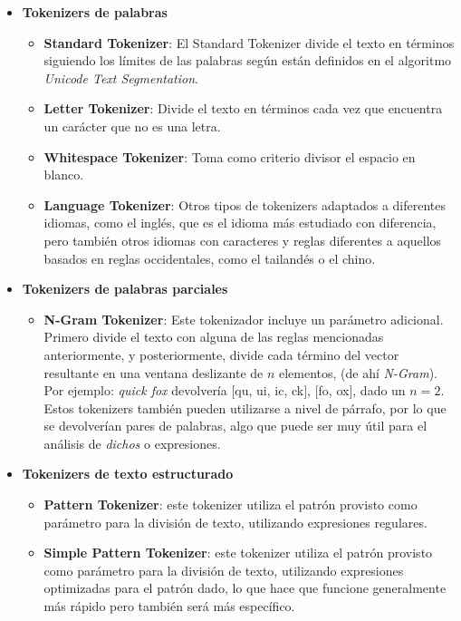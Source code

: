 \begin{itemize}
    
    \item \textbf{Tokenizers de palabras}
    \begin{itemize}
        \item \textbf{Standard Tokenizer}: El Standard Tokenizer divide el texto en términos siguiendo los límites de las palabras según están definidos en el algoritmo \textit{Unicode Text Segmentation}. 
        \item \textbf{Letter Tokenizer}: Divide el texto en términos cada vez que encuentra un carácter que no es una letra.
        \item \textbf{Whitespace Tokenizer}: Toma como criterio divisor el espacio en blanco.
        \item \textbf{Language Tokenizer}: Otros tipos de tokenizers adaptados a diferentes idiomas, como el inglés, que es el idioma más estudiado con diferencia, pero también otros idiomas con caracteres y reglas diferentes a aquellos basados en reglas occidentales, como el tailandés o el chino.
    \end{itemize}
    \item \textbf{Tokenizers de palabras parciales}
    \begin{itemize}
        \item \textbf{N-Gram Tokenizer}: Este tokenizador incluye un parámetro adicional. Primero divide el texto con alguna de las reglas mencionadas anteriormente, y posteriormente, divide cada término del vector resultante en una ventana deslizante de $n$ elementos, (de ahí \textit{N-Gram}). Por ejemplo: \textit{quick fox} devolvería $[$qu, ui, ic, ck$]$, $[$fo, ox$]$, dado un $n = 2$. Estos tokenizers también pueden utilizarse a nivel de párrafo, por lo que se devolverían pares de palabras, algo que puede ser muy útil para el análisis de \textit{dichos} o expresiones.
    \end{itemize}
    \item \textbf{Tokenizers de texto estructurado}
    \begin{itemize}
        \item \textbf{Pattern Tokenizer}: este tokenizer utiliza el patrón provisto como parámetro para la división de texto, utilizando expresiones regulares.
        \item \textbf{Simple Pattern Tokenizer}: este tokenizer utiliza el patrón provisto como parámetro para la división de texto, utilizando expresiones optimizadas para el patrón dado, lo que hace que funcione generalmente más rápido pero también será más específico.
    \end{itemize}
\end{itemize}

